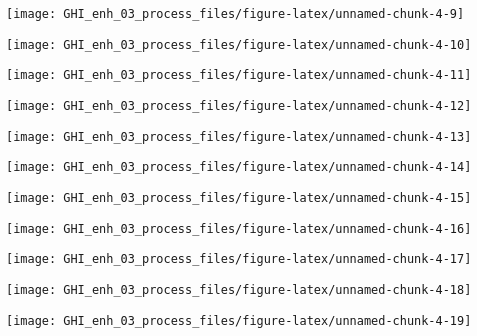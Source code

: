 \documentclass[
  10pt,
  a4paper,oneside]{article}
\begin{document}
\begin{center}\texttt{[image: GHI\_enh\_03\_process\_files/figure-latex/unnamed-chunk-4-9]} \end{center}

\begin{center}\texttt{[image: GHI\_enh\_03\_process\_files/figure-latex/unnamed-chunk-4-10]} \end{center}

\begin{center}\texttt{[image: GHI\_enh\_03\_process\_files/figure-latex/unnamed-chunk-4-11]} \end{center}

\begin{center}\texttt{[image: GHI\_enh\_03\_process\_files/figure-latex/unnamed-chunk-4-12]} \end{center}

\begin{center}\texttt{[image: GHI\_enh\_03\_process\_files/figure-latex/unnamed-chunk-4-13]} \end{center}

\begin{center}\texttt{[image: GHI\_enh\_03\_process\_files/figure-latex/unnamed-chunk-4-14]} \end{center}

\begin{center}\texttt{[image: GHI\_enh\_03\_process\_files/figure-latex/unnamed-chunk-4-15]} \end{center}

\begin{center}\texttt{[image: GHI\_enh\_03\_process\_files/figure-latex/unnamed-chunk-4-16]} \end{center}

\begin{center}\texttt{[image: GHI\_enh\_03\_process\_files/figure-latex/unnamed-chunk-4-17]} \end{center}

\begin{center}\texttt{[image: GHI\_enh\_03\_process\_files/figure-latex/unnamed-chunk-4-18]} \end{center}

\begin{center}\texttt{[image: GHI\_enh\_03\_process\_files/figure-latex/unnamed-chunk-4-19]} \end{center}
\end{document}

